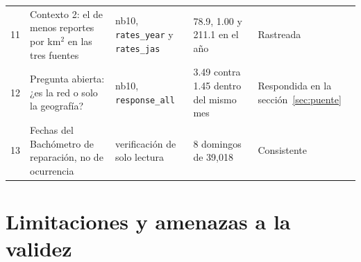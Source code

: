 \documentclass[11pt]{article}
\newcommand{\cod}[1]{\nolinkurl{#1}}
\begin{document}
\begin{longtable}{L{0.4cm} L{4.4cm} L{3.6cm} L{2.8cm} L{3.8cm}}
  11 & Contexto 2: el de menos reportes por km$^2$ en las tres fuentes & nb10, \cod{rates_year} y \cod{rates_jas} & 78.9, 1.00 y 211.1 en el año & Rastreada \\
  12 & Pregunta abierta: ¿es la red o solo la geografía? & nb10, \cod{response_all} & 3.49 contra 1.45 dentro del mismo mes & Respondida en la sección~\ref{sec:puente} \\
  13 & Fechas del Bachómetro de reparación, no de ocurrencia & verificación de solo lectura & 8 domingos de 39,018 & Consistente \\
\end{longtable}
\setlength{\tabcolsep}{6pt}
\normalsize

\section{Limitaciones y amenazas a la validez}
\label{sec:limites}
\end{document}
